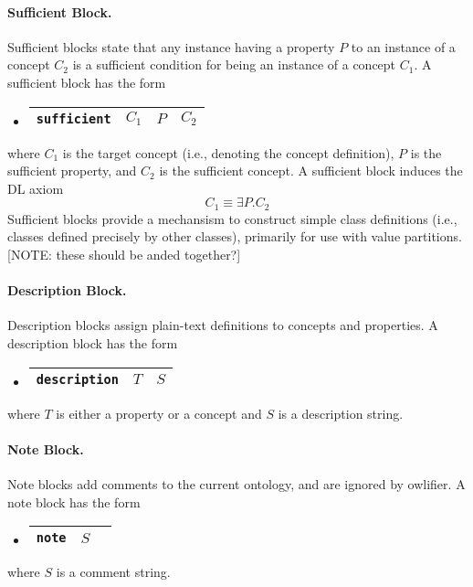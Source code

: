 \documentclass[preprint,number]{elsarticle}
\newcommand{\owlifier}{\textsf{owlifier}}
\begin{document}
\paragraph{Sufficient Block.} Sufficient blocks state that any
instance having a property $P$ to an instance of a concept $C_2$ is a
sufficient condition for being an instance of a concept $C_1$. A
sufficient block has the form
\begin{itemize}
\item[]
  \begin{tabular}{|l|l|l|l|}\hline \texttt{sufficient} & $C_1$ & $P$ & $C_2$
    \\ \hline
  \end{tabular}
\end{itemize}
where $C_1$ is the target concept (i.e., denoting the concept
definition), $P$ is the sufficient property, and $C_2$ is the
sufficient concept. A sufficient block induces the DL axiom \[C_1
\equiv \exists P.C_2\] Sufficient blocks provide a mechansism to
construct simple class definitions (i.e., classes defined precisely by
other classes), primarily for use with value partitions. [NOTE: these
should be anded together?]

\paragraph{Description Block.} Description blocks assign plain-text
definitions to concepts and properties. A description block has the
form
\begin{itemize}
\item[]
  \begin{tabular}{|l|l|l|}\hline \texttt{description} & $T$ & $S$
\\ \hline
  \end{tabular}
\end{itemize}
where $T$ is either a property or a concept and $S$ is a description
string.

\paragraph{Note Block.} Note blocks add comments to the current
ontology, and are ignored by \owlifier.  A note block has the form
\begin{itemize}
\item[]
  \begin{tabular}{|l|l|l|}\hline \texttt{note} & $S$
\\ \hline
  \end{tabular}
\end{itemize}
where $S$ is a comment string.
\end{document}
